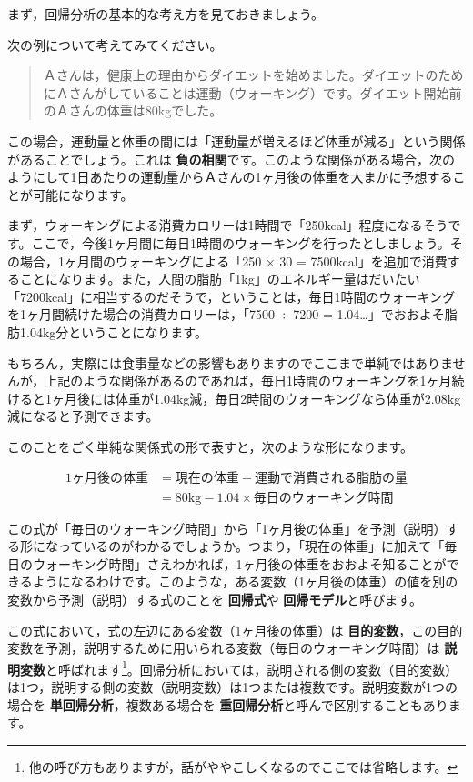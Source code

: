 \documentclass[
  12pt,
  a5jpaper,
  lualatex, ja=standard]{bxjsbook}
\renewcommand{\emph}[1]{\textbf{\color{emph} #1}}
\begin{document}
まず，回帰分析の基本的な考え方を見ておきましょう。

次の例について考えてみてください。

\begin{quote}
Ａさんは，健康上の理由からダイエットを始めました。ダイエットのためにＡさんがしていることは運動（ウォーキング）です。ダイエット開始前のＡさんの体重は80kgでした。
\end{quote}

この場合，運動量と体重の間には「運動量が増えるほど体重が減る」という関係があることでしょう。これは\emph{負の相関}です。このような関係がある場合，次のようにして1日あたりの運動量からＡさんの1ヶ月後の体重を大まかに予想することが可能になります。

まず，ウォーキングによる消費カロリーは1時間で「250kcal」程度になるそうです。ここで，今後1ヶ月間に毎日1時間のウォーキングを行ったとしましょう。その場合，1ヶ月間のウォーキングによる「250 × 30 = 7500kcal」を追加で消費することになります。また，人間の脂肪「1kg」のエネルギー量はだいたい「7200kcal」に相当するのだそうで，ということは，毎日1時間のウォーキングを1ヶ月間続けた場合の消費カロリーは，「7500 ÷ 7200 = 1.04\ldots」でおおよそ脂肪1.04kg分ということになります。

もちろん，実際には食事量などの影響もありますのでここまで単純ではありませんが，上記のような関係があるのであれば，毎日1時間のウォーキングを1ヶ月続けると1ヶ月後には体重が1.04kg減，毎日2時間のウォーキングなら体重が2.08kg減になると予測できます。

このことをごく単純な関係式の形で表すと，次のような形になります。

\begin{align*}
\text{1ヶ月後の体重} &= \text{現在の体重} - \text{運動で消費される脂肪の量} \\
&= 80\text{kg} - 1.04 \times \text{毎日のウォーキング時間}
\end{align*}

この式が「毎日のウォーキング時間」から「1ヶ月後の体重」を予測（説明）する形になっているのがわかるでしょうか。つまり，「現在の体重」に加えて「毎日のウォーキング時間」さえわかれば，1ヶ月後の体重をおおよそ知ることができるようになるわけです。このような，ある変数（1ヶ月後の体重）の値を別の変数から予測（説明）する式のことを\emph{回帰式}や\emph{回帰モデル}と呼びます。

この式において，式の左辺にある変数（1ヶ月後の体重）は\emph{目的変数}，この目的変数を予測，説明するために用いられる変数（毎日のウォーキング時間）は\emph{説明変数}と呼ばれます\footnote{他の呼び方もありますが，話がややこしくなるのでここでは省略します。}。回帰分析においては，説明される側の変数（目的変数）は1つ，説明する側の変数（説明変数）は1つまたは複数です。説明変数が1つの場合を\emph{単回帰分析}，複数ある場合を\emph{重回帰分析}と呼んで区別することもあります。
\end{document}
